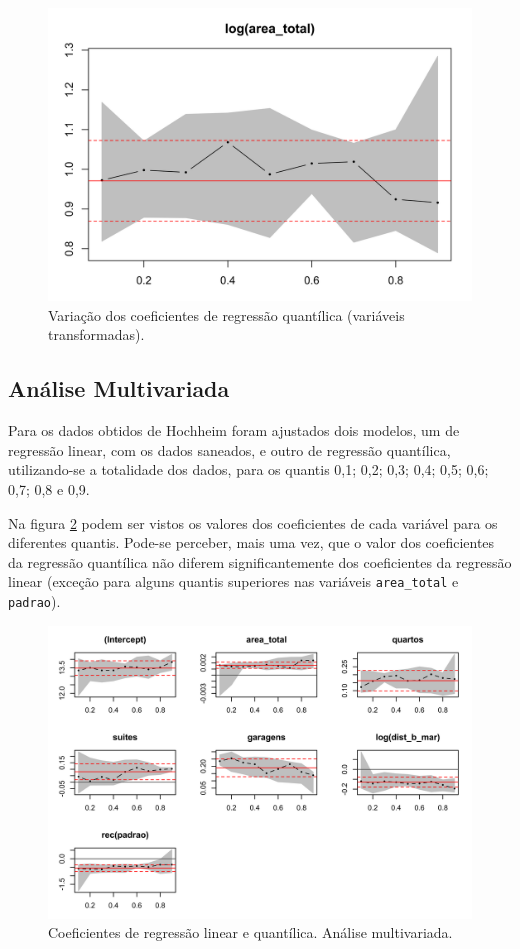 \documentclass[a4paper, 12pt]{article}
\begin{document}
\begin{figure}[H]

{\centering \includegraphics[width=0.7\linewidth]{images/coef2-1} 

}

\caption{Variação dos coeficientes de regressão quantílica (variáveis transformadas).}\label{fig:coef2}
\end{figure}

\hypertarget{analise-multivariada}{%
\subsection{Análise Multivariada}\label{analise-multivariada}}

Para os dados obtidos de Hochheim \autocite*[22-23]{hochheim} foram
ajustados dois modelos, um de regressão linear, com os dados saneados, e
outro de regressão quantílica, utilizando-se a totalidade dos dados,
para os quantis 0,1; 0,2; 0,3; 0,4; 0,5; 0,6; 0,7; 0,8 e 0,9.

Na figura \ref{fig:coefs} podem ser vistos os valores dos coeficientes
de cada variável para os diferentes quantis. Pode-se perceber, mais uma
vez, que o valor dos coeficientes da regressão quantílica não diferem
significantemente dos coeficientes da regressão linear (exceção para
alguns quantis superiores nas variáveis \texttt{area\_total} e
\texttt{padrao}).

\begin{figure}[H]

{\centering \includegraphics[width=1\linewidth]{images/coefs-1} 

}

\caption{Coeficientes de regressão linear e quantílica. Análise multivariada.}\label{fig:coefs}
\end{figure}
\end{document}
